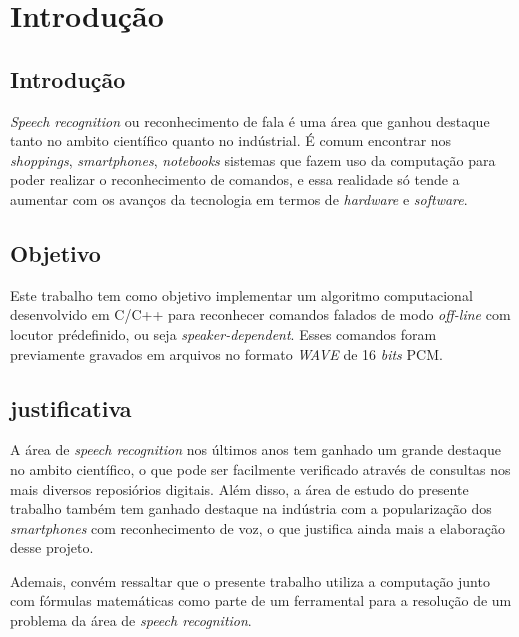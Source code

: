\documentclass[a4paper,12pt,twoside,openright]{report}
\begin{document}
\chapter{Introdu\c{c}\~{a}o}
\thispagestyle{myheadings}
\pagestyle{myheadings}
\section{Introdu\c{c}\~{a}o}
\label{cap1}
\par \textit{Speech recognition} ou reconhecimento de fala \'{e} uma \'{a}rea que ganhou destaque tanto no ambito cient\'{i}fico quanto no ind\'{u}strial. \'{E} comum encontrar nos \textit{shoppings}, \textit{smartphones}, \textit{notebooks} sistemas que fazem uso da computa{\c c}\~{a}o para poder realizar o reconhecimento de comandos, e essa realidade s\'{o} tende a aumentar com os avan{\c c}os da tecnologia em termos de \textit{hardware} e \textit{software}. 

\section{Objetivo}
\par Este trabalho tem como objetivo implementar um algoritmo computacional desenvolvido em C/C++ para reconhecer comandos falados de modo \textit{off-line} com locutor pr\'{e}definido, ou seja \textit{speaker-dependent}. Esses comandos foram previamente gravados em arquivos no formato \textit{WAVE} de 16 \textit{bits} PCM.

\section{justificativa}
\par A \'{a}rea de \textit{speech recognition} nos \'{u}ltimos anos tem ganhado um grande destaque no ambito cient\'{i}fico, o que pode ser facilmente verificado atrav\'{e}s de consultas nos mais diversos reposi\'{o}rios digitais. Al\'{e}m disso, a \'{a}rea de estudo do presente trabalho tamb\'{e}m tem ganhado destaque na ind\'{u}stria com a populariza{\c c}\~{a}o dos \textit{smartphones} com reconhecimento de voz, o que justifica ainda mais a elabora{\c c}\~{a}o desse projeto.
\par Ademais, conv\'{e}m ressaltar que o presente trabalho utiliza a computa{\c c}\~{a}o junto com f\'{o}rmulas matem\'{a}ticas como parte de um ferramental para a resolu{\c c}\~{a}o de um problema da \'{a}rea de \textit{speech recognition}. 
\end{document}
